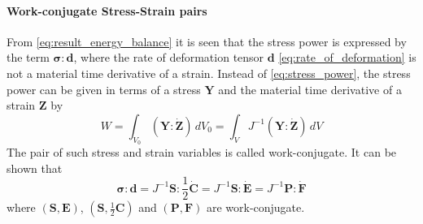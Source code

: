 \paragraph*{Work-conjugate Stress-Strain pairs}
From \cref{eq:result_energy_balance} it is seen that the stress power is expressed by the term \(\bm{\sigma} : \mathbf{d}\), where the rate of deformation tensor \(\mathbf{d}\) \cref{eq:rate_of_deformation} is not a material time derivative of a strain. Instead of \cref{eq:stress_power}, the stress power can be given in terms of a stress \(\mathbf{Y}\) and the material time derivative of a strain \(\mathbf{Z}\) by 
\begin{equation}
    W = \int_{V_{0}}^{}\left(\mathbf{Y} : \dot{\mathbf{Z}}\right) \, dV_{0}
    = \int_{V}^{}J^{-1}\left(\mathbf{Y} : \dot{\mathbf{Z}}\right) \, dV
\end{equation}
The pair of such stress and strain variables is called work-conjugate. It can be shown that 
\begin{equation}
    \bm{\sigma} : \mathbf{d} 
    = J^{-1} \mathbf{S} : \frac{1}{2} \dot{\mathbf{C}}
    = J^{-1} \mathbf{S} : \dot{\mathbf{E}}
    = J^{-1} \mathbf{P} : \dot{\mathbf{F}}
    \label{eq:work_conjugates}
\end{equation}
where \((\mathbf{S} , \mathbf{E})\), \((\mathbf{S} ,\frac{1}{2} \mathbf{C})\) and \((\mathbf{P} , \mathbf{F})\) are work-conjugate.

